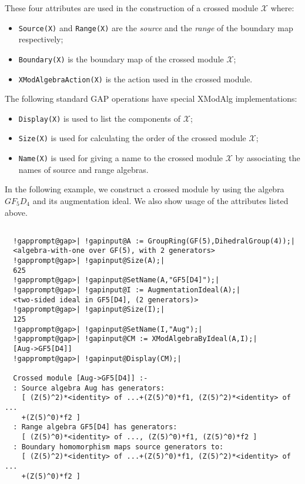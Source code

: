 \documentclass[a4paper,11pt]{report}
\begin{document}
{{{ These four attributes are used in the construction of a crossed module $\mathcal{X}$ where: 
\begin{itemize}
\item  \texttt{Source(X)} and \texttt{Range(X)} are the \emph{source} and the \emph{range} of the boundary map respectively; 
\item  \texttt{Boundary(X)} is the boundary map of the crossed module $\mathcal{X}$; 
\item  \texttt{XModAlgebraAction(X)} is the action used in the crossed module. 
\end{itemize}
 The following standard \textsf{GAP} operations have special \textsf{XModAlg} implementations: 
\begin{itemize}
\item  \texttt{Display(X)} is used to list the components of $\mathcal{X}$; 
\item  \texttt{Size(X)} is used for calculating the order of the crossed module $\mathcal{X}$; 
\item  \texttt{Name(X)} is used for giving a name to the crossed module $\mathcal{X}$ by associating the names of source and range algebras. 
\end{itemize}
 In the following example, we construct a crossed module by using the algebra $GF_{5}D_{4}$ and its augmentation ideal. We also show usage of the attributes listed above. }

 
\begin{Verbatim}[commandchars=!@|,fontsize=\small,frame=single,label=Example]
  
  !gapprompt@gap>| !gapinput@A := GroupRing(GF(5),DihedralGroup(4));|
  <algebra-with-one over GF(5), with 2 generators>
  !gapprompt@gap>| !gapinput@Size(A);|
  625
  !gapprompt@gap>| !gapinput@SetName(A,"GF5[D4]");|
  !gapprompt@gap>| !gapinput@I := AugmentationIdeal(A);|
  <two-sided ideal in GF5[D4], (2 generators)>
  !gapprompt@gap>| !gapinput@Size(I);|
  125
  !gapprompt@gap>| !gapinput@SetName(I,"Aug");|
  !gapprompt@gap>| !gapinput@CM := XModAlgebraByIdeal(A,I);|
  [Aug->GF5[D4]]
  !gapprompt@gap>| !gapinput@Display(CM);|
  
  Crossed module [Aug->GF5[D4]] :- 
  : Source algebra Aug has generators:
    [ (Z(5)^2)*<identity> of ...+(Z(5)^0)*f1, (Z(5)^2)*<identity> of ...
    +(Z(5)^0)*f2 ]
  : Range algebra GF5[D4] has generators:
    [ (Z(5)^0)*<identity> of ..., (Z(5)^0)*f1, (Z(5)^0)*f2 ]
  : Boundary homomorphism maps source generators to:
    [ (Z(5)^2)*<identity> of ...+(Z(5)^0)*f1, (Z(5)^2)*<identity> of ...
    +(Z(5)^0)*f2 ]
  

\end{Verbatim}}}
\end{document}
